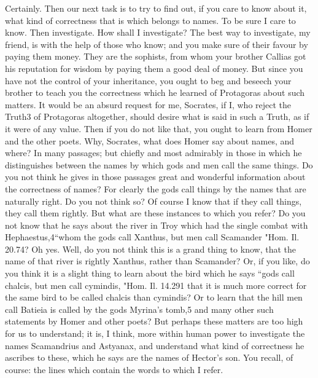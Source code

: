 \hermogenesspeaks
Certainly.
\socratesspeaks
Then our next task is to try to find out, if you care to know about it, what kind of correctness that is which belongs to names.
\hermogenesspeaks
To be sure I care to know.
\socratesspeaks
Then investigate.
\hermogenesspeaks
How shall I investigate?
\socratesspeaks
The best way to investigate, my friend, is with the help of those who know; and you make sure of their favour by paying them money. They are the sophists,  from whom your brother Callias got his reputation for wisdom by paying them a good deal of money. But since you have not the control of your inheritance, you ought to beg and beseech your brother to teach you the correctness which he learned of Protagoras about such matters.
\hermogenesspeaks
It would be an absurd request for me, Socrates, if I, who reject the Truth3 of Protagoras altogether, should desire what is said in such a Truth, as if it were of any value.
\socratesspeaks
Then if you do not like that,  you ought to learn from Homer and the other poets.
\hermogenesspeaks
Why, Socrates, what does Homer say about names, and where?
\socratesspeaks
In many passages; but chiefly and most admirably in those in which he distinguishes between the names by which gods and men call the same things. Do you not think he gives in those passages great and wonderful information about the correctness of names? For clearly the gods call things  by the names that are naturally right. Do you not think so?
\hermogenesspeaks
Of course I know that if they call things, they call them rightly. But what are these instances to which you refer?
\socratesspeaks
Do you not know that he says about the river in Troy which had the single combat with Hephaestus,4``whom the gods call Xanthus, but men call Scamander
"Hom. Il. 20.74?
\hermogenesspeaks
Oh yes. 
\socratesspeaks
Well, do you not think this is a grand thing to know, that the name of that river is rightly Xanthus, rather than Scamander? Or, if you like, do you think it is a slight thing to learn about the bird which he says ``gods call chalcis, but men call cymindis,
"Hom. Il. 14.291 that it is much more correct for the same bird to be called chalcis than cymindis? Or to learn that the hill men call Batieia is called by the gods Myrina's tomb,5 and many other such statements by Homer and other poets?  But perhaps these matters are too high for us to understand; it is, I think, more within human power to investigate the names Scamandrius and Astyanax, and understand what kind of correctness he ascribes to these, which he says are the names of Hector's son. You recall, of course: the lines which contain the words to which I refer.
